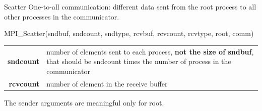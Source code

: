 \documentclass[aspectratio=43]{beamer}
\begin{document}
\begin{frame}[fragile]{Scatter}
One-to-all communication: different data sent from the root process to all other processes in the communicator.\\
\begin{Pseudolisting}[]{}
MPI_Scatter(sndbuf, sndcount, sndtype,
            rcvbuf, rcvcount, rcvtype, root, comm)
\end{Pseudolisting}
\begin{black1block}{}
\begin{tabular}{rp{8cm}}
    \textbf{sndcount} & number of elements sent to each process, {\textbf{not the size of sndbuf}}, that should be sndcount times the number of process in the communicator\\
\textbf{rcvcount} & number of element in the receive buffer\\
\end{tabular}
\end{black1block}
The sender arguments are meaningful only for root.
\end{frame}


\end{document}

